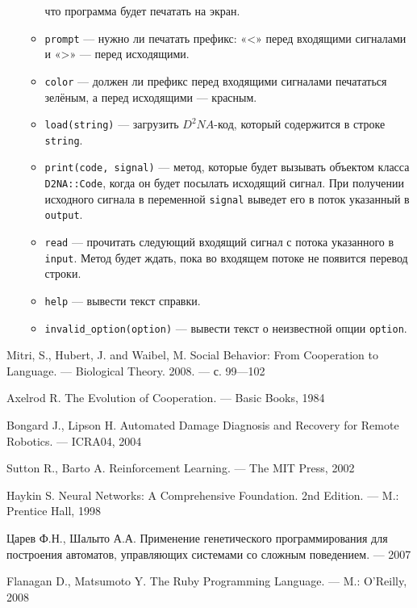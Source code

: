 \documentclass[utf8,a5paper,portrait,12pt]{eskdtext}
\begin{document}
\begin{itemize}
\begin{itemize}
                что программа будет печатать на экран.
          \item \texttt{prompt} — нужно ли печатать префикс: «<» перед
                входящими сигналами и «>» — перед исходящими.
          \item \texttt{color} — должен ли префикс перед входящими сигналами
                печататься зелёным, а перед исходящими — красным.
          \item \texttt{load(string)} — загрузить $D^2NA$-код, который
                содержится в строке \texttt{string}.
          \item \texttt{print(code, signal)} — метод, которые будет вызывать
                объектом класса \\ \texttt{D2NA::Code}, когда он будет посылать
                исходящий сигнал. При получении исходного сигнала в переменной
                \texttt{signal} выведет его в поток указанный в \texttt{output}.
          \item \texttt{read} — прочитать следующий входящий сигнал с потока
                указанного в \texttt{input}. Метод будет ждать, пока во
                входящем потоке не появится перевод строки.
          \item \texttt{help} — вывести текст справки.
          \item \texttt{invalid\_option(option)} — вывести текст о неизвестной
                опции \texttt{option}.
        \end{itemize}
\end{itemize}

\newpage
\begin{thebibliography}{}

    Mitri, S., Hubert, J. and Waibel, M. Social Behavior: From Cooperation to
    Language. — Biological Theory. 2008. — с. 99—102

    Axelrod R. The Evolution of Cooperation. — Basic Books, 1984

    Bongard J., Lipson H. Automated Damage Diagnosis and Recovery for Remote
    Robotics. — ICRA04, 2004

    Sutton R., Barto A. Reinforcement Learning. — The MIT Press, 2002

    Haykin S. Neural Networks: A Comprehensive Foundation. 2nd Edition. — M.: Prentice Hall, 1998

    Царев Ф.Н., Шалыто А.А. Применение генетического программирования для
    построения автоматов, управляющих системами со сложным поведением. — 2007
  
      Flanagan D., Matsumoto Y. The Ruby Programming Language. — M.: O'Reilly, 2008

\end{thebibliography}
\end{document}
